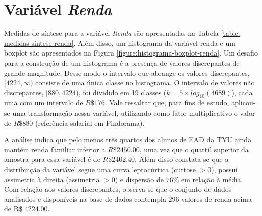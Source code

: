 \documentclass[10pt,a4paper,oneside]{article}
\begin{document}
\section{Variável \textit{Renda}}
\label{section:renda}

Medidas de síntese para a variável \textit{Renda} são apresentadas na Tabela \ref{table: medidas sintese renda}. Além disso, um histograma da variável renda e um boxplot são apresentados na Figura \ref{figure:histograma-boxplot-renda}. Um desafio para a construção  de um histograma é a presença de valores discrepantes de grande magnitude. Desse modo o intervalo que abrange os valores discrepantes, $[4224, \infty)$ consiste de uma única classe no histograma. O intervalo de valores não discrepantes, $[880, 4224)$, foi dividido em 19 classes ($k = 5 \times log_{10}(4689)$), cada uma com um intervalo de $R\$ 176$.  Vale ressaltar que, para fins de estudo, aplicou-se uma transformação nessa variável, utilizando como fator multiplicativo o valor de $R\$880$ (referência salarial em Pindorama).

A análise indica que pelo menos três quartos dos alunos de EAD da TYU ainda mantém renda familiar inferior a $R\$2450.00$, uma vez que o quartil superior da amostra para essa variável é de $R$\$$2402.40$. Além disso constata-se que a distribuição da variável segue uma curva leptocúrtica (curtose $> 0$), possui assimetria à direita (assimetria $> 0$) e dispersão de $76\%$ em relação à média. Com relação aos valores discrepantes, observa-se que o conjunto de dados analisados e disponíveis na base de dados contempla $296$ valores de renda acima de R\$ $4224.00$.
\end{document}
